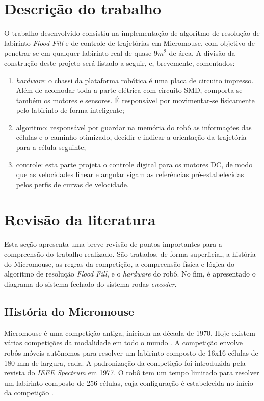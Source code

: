 \section{Descrição do trabalho}
O trabalho desenvolvido consistiu na implementação de algoritmo de resolução de labirinto \emph{Flood Fill} e de controle de trajetórias em Micromouse, com objetivo de penetrar-se em qualquer labirinto real de quase $9 m^2$ de área. A divisão da construção deste projeto será listado a seguir, e, brevemente, comentados:

\begin{enumerate}[leftmargin=2cm,label=\alph*)]
	\item \textit{hardware}: o chassi da plataforma robótica é uma placa de circuito impresso. Além de acomodar toda a parte elétrica com circuito SMD, comporta-se também os motores e sensores. É responsável por movimentar-se fisicamente pelo labirinto de forma inteligente;
	\item algoritmo: responsável por guardar na memória do robô as informações das células e o caminho otimizado, decidir e indicar a orientação da trajetória para a célula seguinte;
	\item controle: esta parte projeta o controle digital para os motores DC, de modo que as velocidades linear e angular sigam as referências pré-estabelecidas pelos perfis de curvas de velocidade.
\end{enumerate}


\section{Revisão da literatura}
Esta seção apresenta uma breve revisão de pontos importantes para a compreensão do trabalho realizado. São tratados, de forma superficial, a história do Micromouse, as regras da competição, a compreensão física e lógica do algoritmo de resolução \emph{Flood Fill}, e o \textit{hardware} do robô. No fim, é apresentado o diagrama do sistema fechado do sistema rodas-\textit{encoder}.

\subsection{História do Micromouse}
Micromouse é uma competição antiga, iniciada na década de 1970. Hoje existem várias competições da modalidade em todo o mundo \cite{5658360}. A competição envolve robôs móveis autônomos para resolver um labirinto composto de 16x16 células de 180 mm de largura, cada. A padronização da competição foi introduzida pela revista do \emph{IEEE Spectrum} em 1977. O robô tem um tempo limitado para resolver um labirinto composto de 256 células, cuja configuração é estabelecida no início da competição \cite{5658360}.

